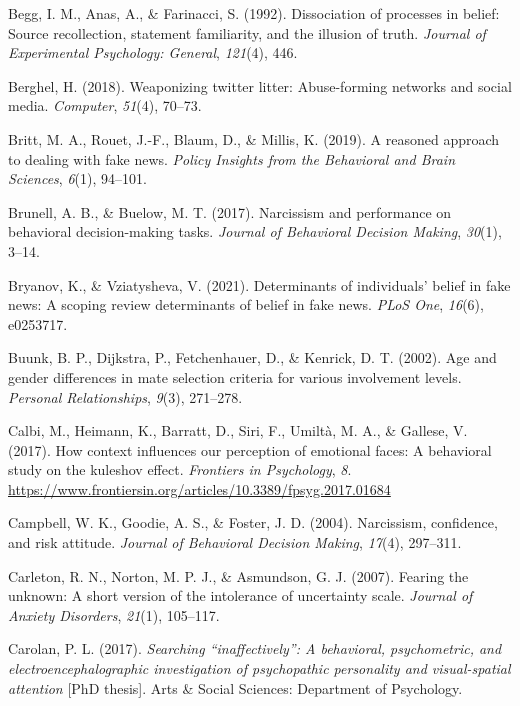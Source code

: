 \documentclass[
  man,
  floatsintext,
  longtable,
  nolmodern,
  notxfonts,
  notimes,
  colorlinks=true,linkcolor=blue,citecolor=blue,urlcolor=blue]{apa7}
\newlength{\cslhangindent}
\newenvironment{CSLReferences}[2] %
 {\begin{list}{}{%
  \setlength{\itemindent}{0pt}
  \setlength{\leftmargin}{0pt}
  \setlength{\parsep}{0pt}
  \ifodd #1
   \setlength{\leftmargin}{\cslhangindent}
   \setlength{\itemindent}{-1\cslhangindent}
  \fi
  \setlength{\itemsep}{#2\baselineskip}}}
 {\end{list}}
\begin{document}
\begin{CSLReferences}{1}{0}
Begg, I. M., Anas, A., \& Farinacci, S. (1992). Dissociation of
processes in belief: Source recollection, statement familiarity, and the
illusion of truth. \emph{Journal of Experimental Psychology: General},
\emph{121}(4), 446.

Berghel, H. (2018). Weaponizing twitter litter: Abuse-forming networks
and social media. \emph{Computer}, \emph{51}(4), 70--73.

Britt, M. A., Rouet, J.-F., Blaum, D., \& Millis, K. (2019). A reasoned
approach to dealing with fake news. \emph{Policy Insights from the
Behavioral and Brain Sciences}, \emph{6}(1), 94--101.

Brunell, A. B., \& Buelow, M. T. (2017). Narcissism and performance on
behavioral decision-making tasks. \emph{Journal of Behavioral Decision
Making}, \emph{30}(1), 3--14.

Bryanov, K., \& Vziatysheva, V. (2021). Determinants of individuals'
belief in fake news: A scoping review determinants of belief in fake
news. \emph{PLoS One}, \emph{16}(6), e0253717.

Buunk, B. P., Dijkstra, P., Fetchenhauer, D., \& Kenrick, D. T. (2002).
Age and gender differences in mate selection criteria for various
involvement levels. \emph{Personal Relationships}, \emph{9}(3),
271--278.

Calbi, M., Heimann, K., Barratt, D., Siri, F., Umiltà, M. A., \&
Gallese, V. (2017). How context influences our perception of emotional
faces: A behavioral study on the kuleshov effect. \emph{Frontiers in
Psychology}, \emph{8}.
\url{https://www.frontiersin.org/articles/10.3389/fpsyg.2017.01684}

Campbell, W. K., Goodie, A. S., \& Foster, J. D. (2004). Narcissism,
confidence, and risk attitude. \emph{Journal of Behavioral Decision
Making}, \emph{17}(4), 297--311.

Carleton, R. N., Norton, M. P. J., \& Asmundson, G. J. (2007). Fearing
the unknown: A short version of the intolerance of uncertainty scale.
\emph{Journal of Anxiety Disorders}, \emph{21}(1), 105--117.

Carolan, P. L. (2017). \emph{Searching {``inaffectively''}: A
behavioral, psychometric, and electroencephalographic investigation of
psychopathic personality and visual-spatial attention} {[}PhD thesis{]}.
Arts \& Social Sciences: Department of Psychology.


\end{CSLReferences}
\end{document}
